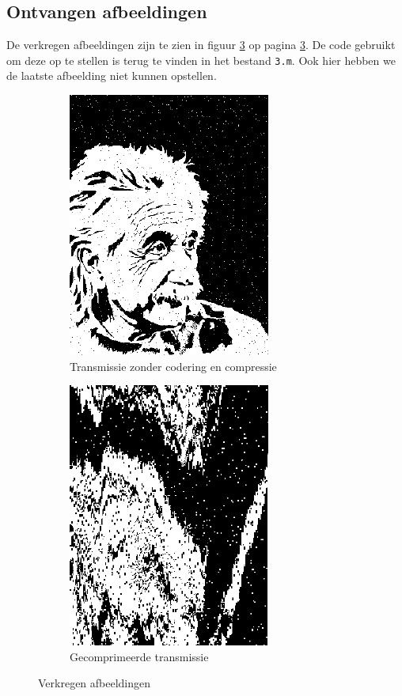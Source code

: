 \documentclass[11pt,a4paper]{article}
\begin{document}
\subsection{Ontvangen afbeeldingen}
De verkregen afbeeldingen zijn te zien in figuur \ref{fig:8_verk_afb} op pagina \ref{fig:8_verk_afb}. De code gebruikt om deze op te stellen is terug te vinden in het bestand \texttt{3.m}. Ook hier hebben we de laatste afbeelding niet kunnen opstellen.

\begin{figure}[h!]
        \centering
\begin{subfigure}[b]{0.33\textwidth}
  		\centering
   		\includegraphics{3_3_1.pdf}
  		\caption{Transmissie zonder codering en compressie}
  		\label{fig:3_3_1}
\end{subfigure}
\begin{subfigure}[b]{0.33\textwidth}
  		\centering
   		\includegraphics{3_3_2.pdf}
  		\caption{Gecomprimeerde transmissie}
  		\label{fig:3_3_2}
\end{subfigure}	
  		\caption{Verkregen afbeeldingen}\label{fig:8_verk_afb}
\end{figure}
\end{document}
